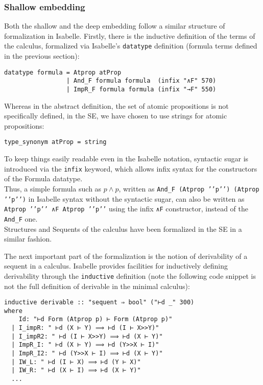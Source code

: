 \subsubsection{Shallow embedding}\label{shallow-embedding}

Both the shallow and the deep embedding follow a similar structure of
formalization in Isabelle. Firstly, there is the inductive definition of
the terms of the calculus, formalized via Isabelle's \texttt{datatype}
definition (formula terms defined in the previous section):

\begin{verbatim}
datatype formula = Atprop atProp
                 | And_F formula formula  (infix "∧F" 570)
                 | ImpR_F formula formula (infix "→F" 550)
\end{verbatim}

Whereas in the abstract definition, the set of atomic propositions is
not specifically defined, in the SE, we have chosen to use strings for
atomic propositions:

\begin{verbatim}
type_synonym atProp = string
\end{verbatim}

To keep things easily readable even in the Isabelle notation, syntactic
sugar is introduced via the \texttt{infix} keyword, which allows infix
syntax for the constructors of the Formula datatype.\\ Thus, a simple
formula such as $p \land p$, written as
\texttt{And\_F (Atprop ’’p’’) (Atprop ’’p’’)} in Isabelle syntax without
the syntactic sugar, can also be written as
\texttt{Atprop ’’p’’ ∧F Atprop ’’p’’} using the infix \texttt{∧F}
constructor, instead of the \texttt{And\_F} one.\\ Structures and
Sequents of the calculus have been formalized in the SE in a similar
fashion.

The next important part of the formalization is the notion of
derivability of a sequent in a calculus. Isabelle provides facilities
for inductively defining derivability through the \texttt{inductive}
definition (note the following code snippet is not the full definition
of derivable in the minimal calculus):

\begin{verbatim}
inductive derivable :: "sequent ⇒ bool" ("⊢d _" 300)
where
    Id: "⊢d Form (Atprop p) ⊢ Form (Atprop p)"
  | I_impR: " ⊢d (X ⊢ Y) ⟹ ⊢d (I ⊢ X>>Y)"
  | I_impR2: " ⊢d (I ⊢ X>>Y) ⟹ ⊢d (X ⊢ Y)"
  | ImpR_I: " ⊢d (X ⊢ Y) ⟹ ⊢d (Y>>X ⊢ I)"
  | ImpR_I2: " ⊢d (Y>>X ⊢ I) ⟹ ⊢d (X ⊢ Y)"
  | IW_L: " ⊢d (I ⊢ X) ⟹ ⊢d (Y ⊢ X)"
  | IW_R: " ⊢d (X ⊢ I) ⟹ ⊢d (X ⊢ Y)"
  ...
\end{verbatim}

